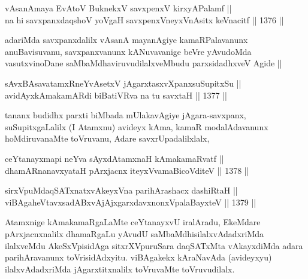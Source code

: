 
\begin{shl}
vAsanAmaya EvAtoV BuknekxV savxpenxV kirxyAPalamf || \\
na hi savxpanxdaqshoV yoVgaH savxpenxV\s neyxVnAsitx keVnacitf ||  1376 ||  
\end{shl}

\begin{artha}
adariMda savxpanxdalilx vAsanA mayanAgiye kamaRPalavanunx anuBavisuvanu, savxpanxvanunx kANuvavanige beVre yAvudoMda vasutxvinoDane saMbaMdhaviruvudilalxveMbudu parxsidadhxveV Agide ||
\end{artha}

\begin{shl}
sAvxBAsavatamxRneYvA\s \s setxV jAgarxtasxvXpanxsuSupitxSu || \\
avidAyxkAmakamARdi biBatiVRva na tu savxtaH ||  1377 ||  
\end{shl}

\begin{artha}
tananx budidhx parxti biMbada mUlakavAgiye jAgara-savxpanx, suSupitxgaLalilx (I Atamxnu) avideyx kAma, kamaR modalAdavanunx hoMdiruvanaMte toVruvanu, Adare savxrUpadalilxlalx, 
\end{artha}



\begin{shl}
ceYtanayxmapi neYva sAyxdAtamxnaH kAmakamaRvatf || \\
dhamARnanavxyataH pArxjacnx iteyxVvamaBicoVditeV ||  1378 ||  
\end{shl}
				
\begin{shl}
sirxVpuMdaqSATxnatxvAkeyxVna parihArashacx dashiRtaH || \\
viBAgaheVtavxsadABxvAjAjxgarxdavxnonxVpalaBayxteV ||  1379 ||  
\end{shl}

\begin{artha}
Atamxnige kAmakamaRgaLaMte ceYtanayxvU iralAradu, EkeMdare pArxjacnxnalilx dhamaRgaLu yAvudU saMbaMdhisilalxvAdadxriMda ilalxveMdu AkeSxVpisidAga sitxrXVpuruSara daqSATxMta vAkayxdiMda adara parihAravanunx toVrisidAdxyitu. viBAgakekx kAraNavAda (avideyxyu) ilalxvAdadxriMda jAgarxtitxnalilx toVruvaMte toVruvudilalx.
\end{artha}

